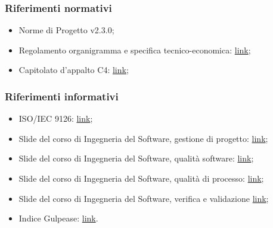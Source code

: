 \documentclass[../piano_di_qualifica.tex]{subfiles}
\begin{document}
\subsubsection{Riferimenti normativi}
\begin{itemize}
	\item Norme di Progetto v2.3.0;
	\item Regolamento organigramma e specifica tecnico-economica: \href{https://www.math.unipd.it/~tullio/IS-1/2020/Progetto/RO.html}{link};
	\item Capitolato d’appalto C4: \href{https://www.math.unipd.it/~tullio/IS-1/2020/Progetto/C4.pdf}{link};
\end{itemize}

\subsubsection{Riferimenti informativi}

\begin{itemize}
	\item ISO/IEC 9126: \href{https://en.wikipedia.org/wiki/ISO/IEC_9126}{link};
	\item Slide del corso di Ingegneria del Software, gestione di progetto: \href{https://www.math.unipd.it/~tullio/IS-1/2020/Dispense/L06.pdf}{link};
	\item Slide del corso di Ingegneria del Software, qualità software: \href{https://www.math.unipd.it/~tullio/IS-1/2020/Dispense/L12.pdf}{link};
	\item Slide del corso di Ingegneria del Software, qualità di processo: \href{https://www.math.unipd.it/~tullio/IS-1/2020/Dispense/L13.pdf}{link};
	\item Slide del corso di Ingegneria del Software, verifica e validazione \href{https://www.math.unipd.it/~tullio/IS-1/2020/Dispense/L14.pdf}{link};
	\item Indice Gulpease: \href{https://it.wikipedia.org/wiki/Indice_Gulpease}{link}.
\end{itemize}
\end{document}

